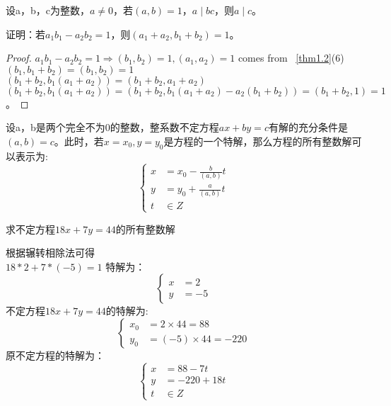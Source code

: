 \documentclass[cn,10pt]{elegantbook}
\begin{document}
\begin{corollary}
  设a，b，c为整数，$a \neq 0$，若$(a,b) = 1$，$a \mid bc $，则$a \mid c$。
\end{corollary}

\begin{example}
  证明：若$a_1b_1-a_2b_2 = 1$，则$(a_1+a_2,b_1+b_2) = 1$。
\end{example}
\begin{proof}
  $a_1b_1 - a_2b_2 = 1 \Rightarrow (b_1,b_2) = 1,(a_1,a_2)=1 $ comes from \  \ref{thm1.2}(6)\\
  $(b_1,b_1+b_2) = (b_1,b_2) = 1$\\
  $(b_1+b_2,b_1(a_1+a_2)) = (b_1+b_2,a_1+a_2)$\\
  $(b_1+b_2,b_1(a_1+a_2)) = (b_1+b_2,b_1(a_1+a_2)-a_2(b_1+b_2)) = (b_1+b_2,1) = 1$。
\end{proof}

\begin{theorem}
  设a，b是两个完全不为0的整数，整系数不定方程$ax+by = c$有解的充分条件是$(a,b) = c$。此时，若$x = x_0,y=y_0$是方程的一个特解，那么方程的所有整数解可以表示为:\\
  $$
  \left\{
    \begin{aligned}
      x &= x_0- \frac{b}{(a,b)}t  \\
      y &= y_0+ \frac{a}{(a,b)}t  \\
      t & \in Z
    \end{aligned}
  \right.
  $$
\end{theorem}

\begin{example}
  求不定方程$18x+7y = 44$的所有整数解
\end{example}
\begin{solution}
  根据辗转相除法可得\\
  $18*2 + 7*(-5) = 1$
  特解为：
  $$
  \left\{
    \begin{aligned}
      x &=2\\
      y &=-5
    \end{aligned}
  \right.
  $$
  不定方程$18x+7y = 44$的特解为:
  $$
  \left\{
    \begin{aligned}
      x_0 &=2 \times 44 = 88\\
      y_0 &=(-5) \times 44 = -220
    \end{aligned}
  \right.
  $$
  原不定方程的特解为：
  $$
  \left\{
    \begin{aligned}
      x &= 88 - 7t\\
      y &= -220+18t\\
      t & \in Z
    \end{aligned}
  \right.
  $$
\end{solution}
\end{document}
